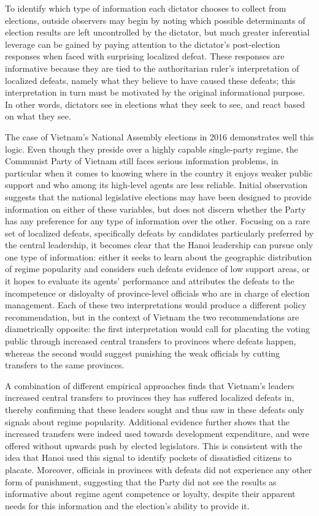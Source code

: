 \documentclass[12pt]{article}
\newcommand{\1}{\mathbbm{1}}
\begin{document}
To identify which type of information each dictator chooses to collect from elections, outside observers may begin by noting which possible determinants of election results are left uncontrolled by the dictator, but much greater inferential leverage can be gained by paying attention to the dictator's post-election responses when faced with surprising localized defeat. These responses are informative because they are tied to the authoritarian ruler's interpretation of localized defeats, namely what they believe to have caused these defeats; this interpretation in turn must be motivated by the original informational purpose. In other words, dictators see in elections what they seek to see, and react based on what they see.

The case of Vietnam's National Assembly elections in 2016 demonstrates well this logic. Even though they preside over a highly capable single-party regime, the Communist Party of Vietnam still faces serious information problems, in particular when it comes to knowing where in the country it enjoys weaker public support and who among its high-level agents are less reliable. Initial observation suggests that the national legislative elections may have been designed to provide information on either of these variables, but does not discern whether the Party has any preference for any type of information over the other. Focusing on a rare set of localized defeats, specifically defeats by candidates particularly preferred by the central leadership, it becomes clear that the Hanoi leadership can pursue only one type of information: either it seeks to learn about the geographic distribution of regime popularity and considers such defeats evidence of low support areas, or it hopes to evaluate its agents' performance and attributes the defeats to the incompetence or disloyalty of province-level officials who are in charge of election management. Each of these two interpretations would produce a different policy recommendation, but in the context of Vietnam the two recommendations are diametrically opposite: the first interpretation would call for placating the voting public through increased central transfers to provinces where defeats happen, whereas the second would suggest punishing the weak officials by cutting transfers to the same provinces.

A combination of different empirical approaches finds that Vietnam's leaders increased central transfers to provinces they has suffered localized defeats in, thereby confirming that these leaders sought and thus saw in these defeats only signals about regime popularity. Additional evidence further shows that the increased transfers were indeed used towards development expenditure, and were offered without upwards push by elected legislators. This is consistent with the idea that Hanoi used this signal to identify pockets of dissatisfied citizens to placate. Moreover, officials in provinces with defeats did not experience any other form of punishment, suggesting that the Party did not see the results as informative about regime agent competence or loyalty, despite their apparent needs for this information and the election's ability to provide it. 
\end{document}
